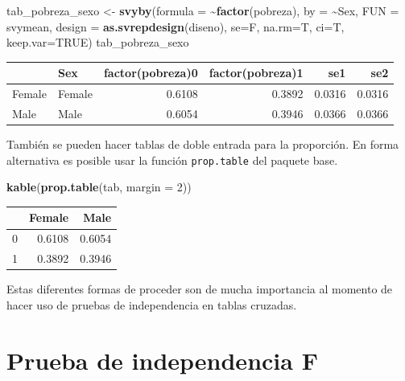 \documentclass[
  spanish,
  12pt,
]{book}
\newenvironment{Shaded}{\begin{snugshade}}{\end{snugshade}}
\newcommand{\AttributeTok}[1]{\textcolor[rgb]{0.13,0.29,0.53}{#1}}
\newcommand{\ConstantTok}[1]{\textcolor[rgb]{0.56,0.35,0.01}{#1}}
\newcommand{\DecValTok}[1]{\textcolor[rgb]{0.00,0.00,0.81}{#1}}
\newcommand{\FunctionTok}[1]{\textcolor[rgb]{0.13,0.29,0.53}{\textbf{#1}}}
\newcommand{\NormalTok}[1]{#1}
\newcommand{\OtherTok}[1]{\textcolor[rgb]{0.56,0.35,0.01}{#1}}
\newcommand{\SpecialCharTok}[1]{\textcolor[rgb]{0.81,0.36,0.00}{\textbf{#1}}}
\begin{document}
\begin{Shaded}
\begin{Highlighting}[]
\NormalTok{tab\_pobreza\_sexo }\OtherTok{\textless{}{-}} \FunctionTok{svyby}\NormalTok{(}\AttributeTok{formula =} \SpecialCharTok{\textasciitilde{}}\FunctionTok{factor}\NormalTok{(pobreza), }
                          \AttributeTok{by =} \SpecialCharTok{\textasciitilde{}}\NormalTok{Sex,}
                          \AttributeTok{FUN =}\NormalTok{ svymean, }
                          \AttributeTok{design =} \FunctionTok{as.svrepdesign}\NormalTok{(diseno), }
                          \AttributeTok{se=}\NormalTok{F, }\AttributeTok{na.rm=}\NormalTok{T, }\AttributeTok{ci=}\NormalTok{T, }\AttributeTok{keep.var=}\ConstantTok{TRUE}\NormalTok{)}
\NormalTok{tab\_pobreza\_sexo}
\end{Highlighting}
\end{Shaded}

\begin{tabular}{l|l|r|r|r|r}
\hline
  & Sex & factor(pobreza)0 & factor(pobreza)1 & se1 & se2\\
\hline
Female & Female & 0.6108 & 0.3892 & 0.0316 & 0.0316\\
\hline
Male & Male & 0.6054 & 0.3946 & 0.0366 & 0.0366\\
\hline
\end{tabular}

También se pueden hacer tablas de doble entrada para la proporción.
En forma alternativa es posible usar la función \texttt{prop.table} del paquete base.

\begin{Shaded}
\begin{Highlighting}[]
\FunctionTok{kable}\NormalTok{(}\FunctionTok{prop.table}\NormalTok{(tab, }\AttributeTok{margin =} \DecValTok{2}\NormalTok{))}
\end{Highlighting}
\end{Shaded}

\begin{tabular}{l|r|r}
\hline
  & Female & Male\\
\hline
0 & 0.6108 & 0.6054\\
\hline
1 & 0.3892 & 0.3946\\
\hline
\end{tabular}

Estas diferentes formas de proceder son de mucha importancia al momento de hacer uso de pruebas de independencia en tablas cruzadas.

\section{Prueba de independencia F}\label{prueba-de-independencia-f}
\end{document}
